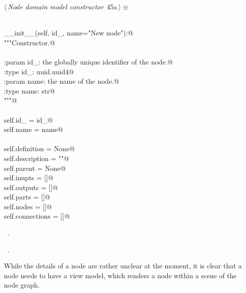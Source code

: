\documentclass[
    a4paper,      %
    10pt,         %
    openright,    %
    notitlepage,  %
    parskip=half, %
]{scrreprt}       %
\theoremstyle{definition}                    %
\begin{document}
\begin{flushleft} \small
\begin{minipage}{\linewidth}\label{scrap58}\raggedright\small
{} $\langle\,${\itshape Node domain model constructor}\nobreak\ {\footnotesize {45a}}$\,\rangle\equiv$
\vspace{-1exm}
\begin{list}{}{} \item
\mbox{}\lstinline@@\\
\mbox{}\lstinline@def __init__(self, id_, name="New node"):@\\
\mbox{}\lstinline@    """Constructor.@\\
\mbox{}\lstinline@@\\
\mbox{}\lstinline@    :param id_: the globally unique identifier of the node.@\\
\mbox{}\lstinline@    :type  id_: uuid.uuid4@\\
\mbox{}\lstinline@    :param name: the name of the node.@\\
\mbox{}\lstinline@    :type  name: str@\\
\mbox{}\lstinline@    """@\\
\mbox{}\lstinline@@\\
\mbox{}\lstinline@    self.id_   = id_@\\
\mbox{}\lstinline@    self.name = name@\\
\mbox{}\lstinline@@\\
\mbox{}\lstinline@    self.definition = None@\\
\mbox{}\lstinline@    self.description = ""@\\
\mbox{}\lstinline@    self.parent = None@\\
\mbox{}\lstinline@    self.inupts = []@\\
\mbox{}\lstinline@    self.outputs = []@\\
\mbox{}\lstinline@    self.parts = []@\\
\mbox{}\lstinline@    self.nodes = []@\\
\mbox{}\lstinline@    self.connections = []@\\
\mbox{}\lstinline@@{\NWsep}
\end{list}
\vspace{-1.5ex}
\footnotesize
\begin{list}{}{\setlength{\itemsep}{-\parsep}\setlength{\itemindent}{-\leftmargin}}
\item \NWtxtMacroDefBy\ .
\item \NWtxtMacroRefIn\ .

\item{}
\end{list}
\end{minipage}\vspace{4ex}
\end{flushleft}
While the details of a node are rather unclear at the moment, it is clear that
a node needs to have a view model, which renders a node within a scene of the
node graph.
\end{document}
